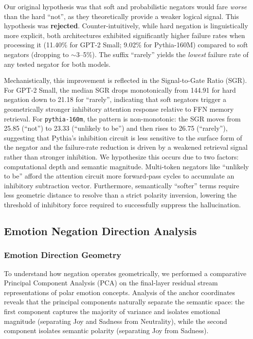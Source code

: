 \documentclass[11pt]{article}
\begin{document}
Our original hypothesis was that soft and probabilistic negators would fare \emph{worse} than the hard ``not'', as they theoretically provide a weaker logical signal. This hypothesis was \textbf{rejected}. Counter-intuitively, while hard negation is linguistically more explicit, both architectures exhibited significantly higher failure rates when processing it (11.40\% for GPT-2 Small; 9.02\% for Pythia-160M) compared to soft negators (dropping to $\sim$3--5\%). The suffix ``rarely'' yields the \emph{lowest} failure rate of any tested negator for both models.

Mechanistically, this improvement is reflected in the Signal-to-Gate Ratio (SGR). For GPT-2 Small, the median SGR drops monotonically from 144.91 for hard negation down to 21.18 for ``rarely'', indicating that soft negators trigger a geometrically stronger inhibitory attention response relative to FFN memory retrieval. For \texttt{pythia-160m}, the pattern is non-monotonic: the SGR moves from 25.85 (``not'') to 23.33 (``unlikely to be'') and then rises to 26.75 (``rarely''), suggesting that Pythia's inhibition circuit is less sensitive to the surface form of the negator and the failure-rate reduction is driven by a weakened retrieval signal rather than stronger inhibition. We hypothesize this occurs due to two factors: computational depth and semantic magnitude. Multi-token negators like ``unlikely to be'' afford the attention circuit more forward-pass cycles to accumulate an inhibitory subtraction vector. Furthermore, semantically ``softer'' terms require less geometric distance to resolve than a strict polarity inversion, lowering the threshold of inhibitory force required to successfully suppress the hallucination.


\subsection{Emotion Negation Direction Analysis}

\subsubsection{Emotion Direction Geometry}
To understand how negation operates geometrically, we performed a comparative Principal Component Analysis (PCA) on the final-layer residual stream representations of polar emotion concepts. Analysis of the anchor coordinates reveals that the principal components naturally separate the semantic space: the first component captures the majority of variance and isolates emotional magnitude (separating Joy and Sadness from Neutrality), while the second component isolates semantic polarity (separating Joy from Sadness).
\end{document}
